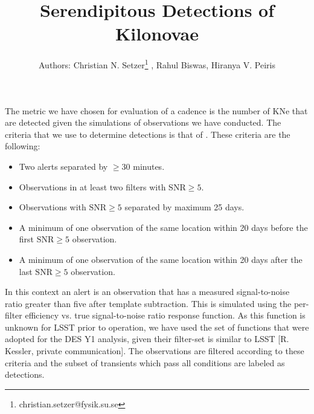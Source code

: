 \documentclass[a4paper,10pt]{article}
\title{Serendipitous Detections of Kilonovae}
\author{Authors: Christian N. Setzer\footnote{christian.setzer@fysik.su.se} , Rahul Biswas, Hiranya V. Peiris}
\date{}
\begin{document}
\maketitle

The metric we have chosen for evaluation of a cadence is the number of KNe that are detected given the simulations of observations we have conducted. The criteria that we use to determine detections is that of \citet{Scolnic2017a}. These criteria are the following:
\begin{itemize}
  \item Two alerts separated by $\geq 30$ minutes.
  \item Observations in at least two filters with $\mathrm{SNR} \geq 5$.
  \item Observations with $\mathrm{SNR} \geq 5$ separated by maximum 25 days.
  \item A minimum of one observation of the same location within 20 days before the first $\mathrm{SNR} \geq 5$ observation.
  \item A minimum of one observation of the same location within 20 days after the last $\mathrm{SNR} \geq 5$ observation.
\end{itemize}

In this context an alert is an observation that has a measured signal-to-noise ratio greater than five after template subtraction. This is simulated using the per-filter efficiency vs. true signal-to-noise ratio response function. As this function is unknown for LSST prior to operation, we have used the set of functions that were adopted for the DES Y1 analysis, given their filter-set is similar to LSST [R. Kessler, private communication]. The observations are filtered according to these criteria and the subset of transients which pass all conditions are labeled as detections.
\end{document}
